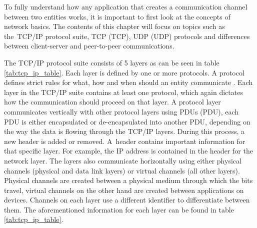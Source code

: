 To fully understand how any application that creates a communication channel between two entities works, it is important to first look at the concepts of network basics. The contents of this chapter will focus on topics such as the~TCP/IP protocol suite, TCP (\acl{TCP}), UDP (\acl{UDP}) protocols and differences between client-server and peer-to-peer communications.

The TCP/IP protocol suite consists of 5 layers as can be seen in table \ref{tab:tcp_ip_table}. Each layer is defined by one or more protocols. A protocol defines strict rules for what, how and when should an entity communicate \cite{Forouzan2010}. Each layer in the TCP/IP suite contains at least one protocol, which again dictates how the communication should proceed on that layer. A protocol layer communicates vertically with other protocol layers using PDUs (\acl{PDU}), each PDU is either encapsulated or de-encapsulated into another PDU, depending on the way the data is flowing through the TCP/IP layers. During this process, a new header is added or removed. A~header contains important information for that specific layer. For example, the IP address is contained in the header for the network layer. The layers also communicate horizontally using either physical channels (physical and data link layers) or virtual channels (all other layers). Physical channels are created between a physical medium through which the bits travel, virtual channels on the other hand are created between applications on devices. Channels on each layer use a different identifier to differentiate between them. The aforementioned information for each layer can be found in table \ref{tab:tcp_ip_table}.

